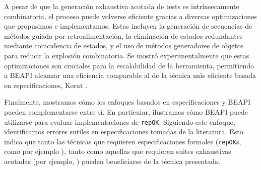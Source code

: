 A pesar de que la generación exhaustiva acotada de tests es intrínsecamente combinatoria, 
el proceso puede volverse eficiente gracias a diversas optimizaciones que propusimos e implementamos. 
Estas incluyen la generación de secuencias de métodos guiada por
retroalimentación, la eliminación de estados redundantes mediante coincidencia
de estados, 
y el uso de métodos generadores de objetos para reducir la explosión combinatoria. 
Se mostró experimentalmente que estas optimizaciones son cruciales para la escalabilidad de la herramienta, 
permitiendo a BEAPI alcanzar una eficiencia comparable al de la técnica más eficiente basada en especificaciones, Korat \cite{Boyapati02}.

Finalmente, mostramos cómo los enfoques basados en especificaciones y BEAPI pueden complementarse entre sí. 
En particular, ilustramos cómo BEAPI puede utilizarse para evaluar implementaciones de \texttt{repOK}. 
Siguiendo este enfoque, identificamos errores sutiles en especificaciones tomadas de la literatura. 
Esto indica que tanto las técnicas que requieren especificaciones formales
(\texttt{repOK}s, como por ejemplo \cite{Rosner15}), tanto como aquellas que requieren suites exhaustivas acotadas (por ejemplo, \cite{Molina+2021}) pueden beneficiarse de la técnica presentada.





